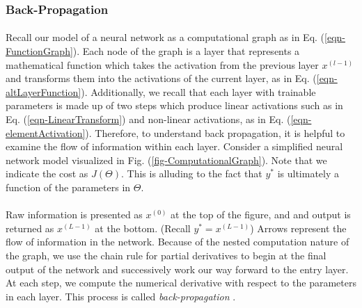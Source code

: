 \documentclass[12pt,letterpaper]{article}
\begin{document}

\subsubsection{Back-Propagation}
\label{subsubsec-BackProp}

\paragraph*{}Recall our model of a neural network as a computational graph as in Eq. (\ref{eqn-FunctionGraph}). Each node of the graph is a layer that represents a mathematical function which takes the activation from the previous layer $x^{(l-1)}$ and transforms them into the activations of the current layer, as in Eq. (\ref{eqn-altLayerFunction}). Additionally, we recall that each layer with trainable parameters is made up of two steps which produce linear activations such as in Eq. (\ref{eqn-LinearTransform}) and non-linear activations, as in Eq. (\ref{eqn-elementActivation}). Therefore, to understand back propagation, it is helpful to examine the flow of information within each layer. Consider a simplified neural network model visualized in Fig. (\ref{fig-ComputationalGraph}). Note that we indicate the cost as $J(\Theta)$. This is alluding to the fact that $y^*$ is ultimately a function of the parameters in $\Theta$.

\paragraph*{}Raw information is presented as $x^{(0)}$ at the top of the figure, and and output is returned as $x^{(L-1)}$ at the bottom. (Recall $y^* = x^{(L-1)}$) Arrows represent the flow of information in the network. Because of the nested computation nature of the graph, we use the chain rule for partial derivatives to begin at the final output of the network and successively work our way forward to the entry layer. At each step, we compute the numerical derivative with respect to the parameters in each layer. This process is called \textit{back-propagation} \cite{Geron,Goodfellow}.
\end{document}
